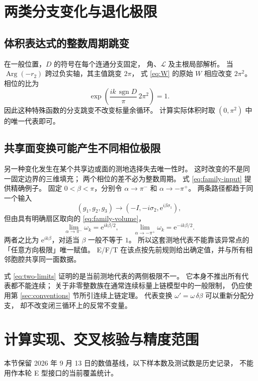 \documentclass[UTF8,11pt,fontset=none]{ctexart}
\numberwithin{equation}{section}
\theoremstyle{definition}
\DeclareMathOperator{\Arg}{Arg}
\DeclareMathOperator{\sgn}{sgn}
\newcommand{\ee}{\mathrm e}
\newcommand{\Id}{I}
\begin{document}
\section{两类分支变化与退化极限}\label{sec:branches}

\subsection{体积表达式的整数周期跳变}

在一般位置，$D$ 的符号在每个连通分支固定，
角、$\mathcal L$ 及主根局部解析。
当 $\Arg(-r_2)$ 跨过负实轴，其主值跳变 $2\pi$，
式 \eqref{eq:W} 的原始 $W$ 相应改变 $2\pi^2$。
相位的比为
\[
 \exp\left(\frac{ik\,\sgn D}{\pi}\,2\pi^2\right)=1.
\]
因此这种特殊函数的分支跳变不改变标量余循环。
计算实际体积时取 $(0,\pi^2)$ 中的唯一代表即可。

\subsection{共享面变换可能产生不同相位极限}

另一种变化发生在某个共享边或面的测地选择失去唯一性时。
这时改变的不是同一固定边界的三维填充；
两个相位的差不必为整数周期。
式 \eqref{eq:family-input} 提供精确例子。
固定 $0<\beta<\pi$，分别令 $\alpha\to\pi^-$ 和 $\alpha\to-\pi^+$。
两条路径都趋于同一个输入
\[
 (g_1,g_2,g_3)\longrightarrow
 (-\Id,-i\sigma_2,\ee^{i\beta\sigma_1}),
\]
但由具有明确扇区取向的 \eqref{eq:family-volume}，
\begin{equation}
 \lim_{\alpha\to\pi^-}\omega_k=\ee^{ik\beta/2},
 \qquad
 \lim_{\alpha\to-\pi^+}\omega_k=\ee^{-ik\beta/2}.
 \label{eq:two-limits}
\end{equation}
两者之比为 $\ee^{ik\beta}$，对适当 $\beta$ 一般不等于 $1$。
所以这套测地代表不能靠该异常点的「任意方向极限」唯一赋值。
E/F/T 在该点按先前规则给出确定值，并与所有相邻胞腔共享同一面数据。

式 \eqref{eq:two-limits} 证明的是当前测地代表的两侧极限不一。
它本身不推出所有代表都不能连续；
关于非零整数族在通常连续标量上链模型中的一般限制，
仍应使用第 \ref{sec:conventions} 节所引连续上链定理。
代表变换 $\omega'\!=\omega\,\delta\beta$ 可以重新分配分支，
却不改变闭三循环上的反常不变量。

\section{计算实现、交叉核验与精度范围}\label{sec:computation}

本节保留 2026 年 9 月 13 日的数值基线，以下样本数及测试数是历史记录，
不能用作本轮 E 型接口的当前覆盖统计。
\end{document}
